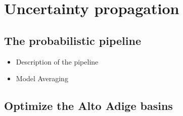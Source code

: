 \chapter{Uncertainty propagation}

\ifpdf
    \graphicspath{{Chapter4/Figs/Raster/}{Chapter4/Figs/PDF/}{Chapter4/Figs/}}
\else
    \graphicspath{{Chapter4/Figs/Vector/}{Chapter4/Figs/}}
\fi

\section{The probabilistic pipeline\label{section4.1}}
\begin{itemize}
    \item Description of the pipeline
    \item Model Averaging
\end{itemize}

\section{Optimize the Alto Adige basins\label{section4.2}}